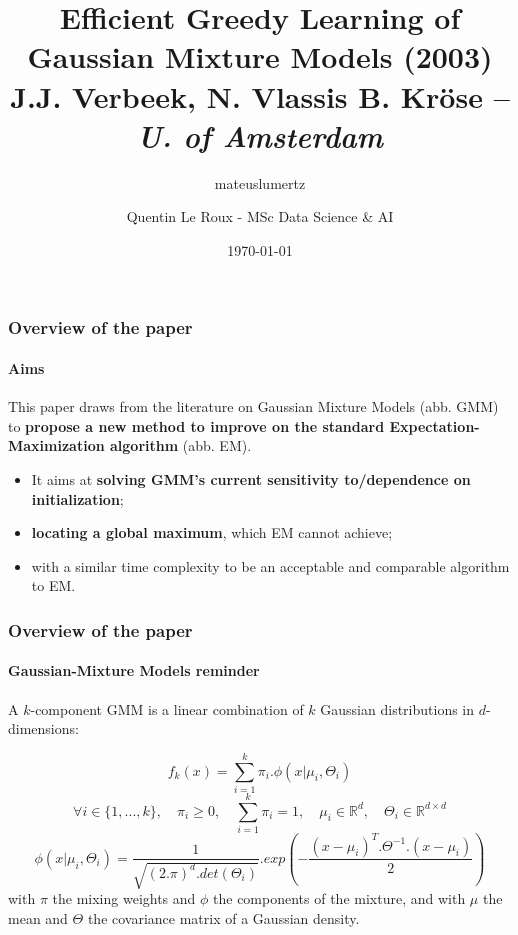 \documentclass[aspectratio=43]{beamer}
\author{mateuslumertz}
\title[Efficient Greedy Learning of GMM]{Efficient Greedy Learning of Gaussian Mixture Models (2003)
\newline \small{J.J. Verbeek, N. Vlassis B. Kröse -- \textit{U. of Amsterdam}}}
\author{Quentin Le Roux - MSc Data Science \& AI}
\date{\today}
\begin{document}
\begin{frame}[plain]
\maketitle
\end{frame}

\begin{frame}
    \frametitle{Overview of the paper}
    \framesubtitle{Aims}
    This paper draws from the literature on Gaussian Mixture Models (abb. GMM) to \textbf{propose a new method to improve on the standard Expectation-Maximization algorithm} (abb. EM).\linebreak
    \begin{small}\begin{itemize}
      \item It aims at \textbf{solving GMM's current sensitivity to/dependence on initialization};
      \item \textbf{locating a global maximum}, which EM cannot achieve;
      \item with a similar time complexity to be an acceptable and comparable algorithm to EM.
    \end{itemize}\end{small}
\end{frame}

\begin{frame}
    \frametitle{Overview of the paper}
    \framesubtitle{Gaussian-Mixture Models reminder}
    A $k$-component GMM is a linear combination of $k$ Gaussian distributions in $d$-dimensions:

    $$f_k(x)=\underset{i=1}{\overset{k}{\sum}}\pi_i.\phi(x|\mu_i,\Theta_i)$$
    $$\forall i \in \{1,...,k\}, \quad \pi_i\ge0, \quad\underset{i=1}{\overset{k}{\sum}}\pi_i=1, \quad \mu_i \in \mathbb{R}^d,\quad\Theta_i\in\mathbb{R}^{d\times d}$$
    $$\phi(x|\mu_i,\Theta_i) = \frac{1}{\sqrt{(2.\pi)^d.det(\Theta_i)}}.exp(-\frac{(x-\mu_i)^T.\Theta^{-1}.(x-\mu_i)}{2})$$\newline
    with $\pi$ the mixing weights and $\phi$ the components of the mixture, and with $\mu$ the mean and $\Theta$ the covariance matrix of a Gaussian density.
\end{frame}
\end{document}
